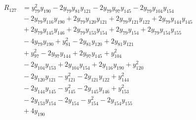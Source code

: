\begin{align*}
R_{127} &={} y_{79}^{2}y_{190} -2y_{79}y_{81}y_{121} -2y_{79}y_{97}y_{145} -2y_{79}y_{104}y_{154} \\
 &{} -2y_{79}y_{116}y_{190} +2y_{79}y_{120}y_{121} +2y_{79}y_{121}y_{122} +2y_{79}y_{144}y_{145} \\
 &{} +2y_{79}y_{145}y_{146} +2y_{79}y_{153}y_{154} +2y_{79}y_{154} +2y_{79}y_{154}y_{155} \\
 &{} -4y_{79}y_{190} +y_{81}^{2} -2y_{81}y_{120} +2y_{81}y_{121} \\
 &{} +y_{97}^{2} -2y_{97}y_{144} +2y_{97}y_{145} +y_{104}^{2} \\
 &{} -2y_{104}y_{153} +2y_{104}y_{154} +2y_{116}y_{190} +y_{120}^{2} \\
 &{} -2y_{120}y_{121} -y_{121}^{2} -2y_{121}y_{122} +y_{144}^{2} \\
 &{} -2y_{144}y_{145} -y_{145}^{2} -2y_{145}y_{146} +y_{153}^{2} \\
 &{} -2y_{153}y_{154} -2y_{154} -y_{154}^{2} -2y_{154}y_{155} \\
 &{} +4y_{190}
\end{align*}
